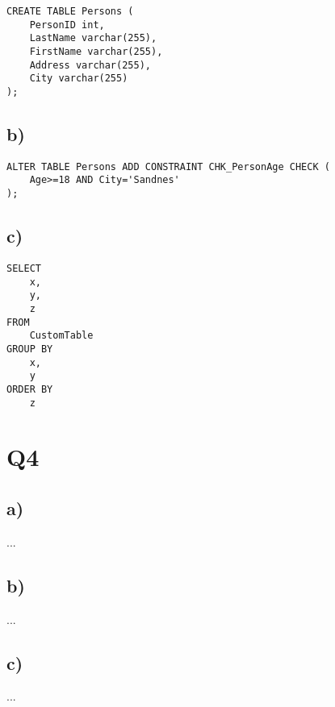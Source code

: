 \documentclass{article}
\begin{document}
\begin{lstlisting}
CREATE TABLE Persons (
    PersonID int,
    LastName varchar(255),
    FirstName varchar(255),
    Address varchar(255),
    City varchar(255)
);
\end{lstlisting}


\subsection*{\small b)}

\begin{lstlisting}
ALTER TABLE Persons ADD CONSTRAINT CHK_PersonAge CHECK (
    Age>=18 AND City='Sandnes'
);
\end{lstlisting}

\subsection*{\small c)}

\begin{lstlisting}
SELECT 
    x,
    y,
    z
FROM 
    CustomTable 
GROUP BY 
    x,
    y
ORDER BY
    z
\end{lstlisting}

\section*{Q4}

\subsection*{\small a)}
...

\subsection*{\small b)}
...

\subsection*{\small c)}
...
\end{document}
